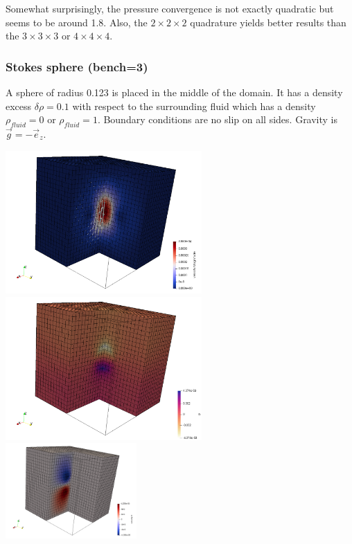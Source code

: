 Somewhat surprisingly, the pressure convergence is not exactly quadratic but seems to be
around 1.8. Also, the $2\times 2\times 2$ 
quadrature yields better results than the $3\times 3\times 3$ or $4\times 4 \times 4$.

\subsubsection*{Stokes sphere (bench=3)}

A sphere of radius 0.123 is placed in the middle of the domain. It has a density excess $\delta\rho=0.1$
with respect to the surrounding fluid which has a density $\rho_{fluid}=0$ or $\rho_{fluid}=1$. 
Boundary conditions are no slip on all sides. Gravity is $\vec{g}=-\vec{e}_z$.

\begin{center}
\includegraphics[width=7.5cm]{python_codes/fieldstone_82/results/sphere/vel.png}
\includegraphics[width=7.5cm]{python_codes/fieldstone_82/results/sphere/p.png}\\
\includegraphics[width=5cm]{python_codes/fieldstone_82/results/sphere/u.png}

\end{center}
